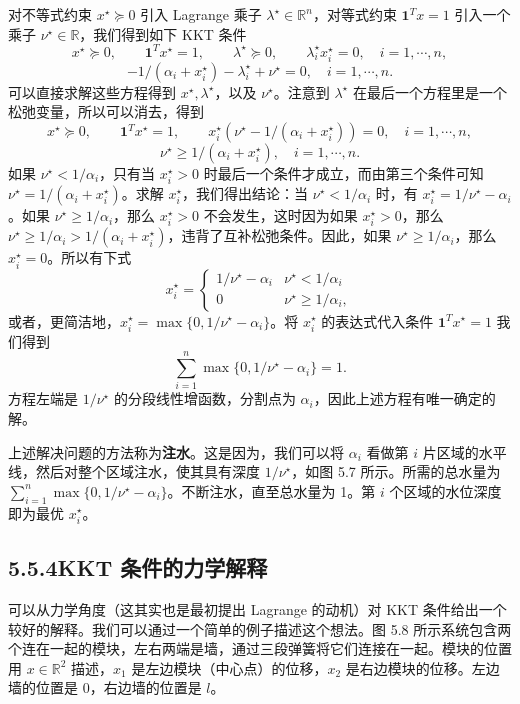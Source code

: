 \documentclass[UTF8,12pt,a4paper,fontset=fandol]{ctexart}
\begin{document}
对不等式约束 $x^\star\succeq 0$ 引入 Lagrange 乘子 $\lambda^\star\in\mathbb{R}^n$，对等式约束 $\mathbf{1}^Tx=1$ 引入一个乘子 $\nu^\star\in\mathbb{R}$，我们得到如下 KKT 条件
\[
x^\star\succeq 0,\qquad \mathbf{1}^Tx^\star=1,\qquad
\lambda^\star\succeq 0,\qquad \lambda_i^\star x_i^\star=0,\quad i=1,\cdots,n,
\]
\[
-1/(\alpha_i+x_i^\star)-\lambda_i^\star+\nu^\star=0,\quad i=1,\cdots,n.
\]
可以直接求解这些方程得到 $x^\star,\lambda^\star$，以及 $\nu^\star$。注意到 $\lambda^\star$ 在最后一个方程里是一个松弛变量，所以可以消去，得到
\[
x^\star\succeq 0,\qquad \mathbf{1}^Tx^\star=1,\qquad
x_i^\star(\nu^\star-1/(\alpha_i+x_i^\star))=0,\quad i=1,\cdots,n,
\]
\[
\nu^\star\geq 1/(\alpha_i+x_i^\star),\quad i=1,\cdots,n.
\]
如果 $\nu^\star<1/\alpha_i$，只有当 $x_i^\star>0$ 时最后一个条件才成立，而由第三个条件可知 $\nu^\star=1/(\alpha_i+x_i^\star)$。求解 $x_i^\star$，我们得出结论：当 $\nu^\star<1/\alpha_i$ 时，有 $x_i^\star=1/\nu^\star-\alpha_i$。如果 $\nu^\star\geq 1/\alpha_i$，那么 $x_i^\star>0$ 不会发生，这时因为如果 $x_i^\star>0$，那么 $\nu^\star\geq 1/\alpha_i>1/(\alpha_i+x_i^\star)$，违背了互补松弛条件。因此，如果 $\nu^\star\geq 1/\alpha_i$，那么 $x_i^\star=0$。所以有下式
\[
x_i^\star=
\begin{cases}
1/\nu^\star-\alpha_i & \nu^\star<1/\alpha_i\\
0 & \nu^\star\geq 1/\alpha_i,
\end{cases}
\]
或者，更简洁地，$x_i^\star=\max\{0,1/\nu^\star-\alpha_i\}$。将 $x_i^\star$ 的表达式代入条件 $\mathbf{1}^Tx^\star=1$ 我们得到
\[
\sum_{i=1}^n\max\{0,1/\nu^\star-\alpha_i\}=1.
\]
方程左端是 $1/\nu^\star$ 的分段线性增函数，分割点为 $\alpha_i$，因此上述方程有唯一确定的解。

上述解决问题的方法称为\textbf{注水}。这是因为，我们可以将 $\alpha_i$ 看做第 $i$ 片区域的水平线，然后对整个区域注水，使其具有深度 $1/\nu^\star$，如图 5.7 所示。所需的总水量为 $\sum_{i=1}^n\max\{0,1/\nu^\star-\alpha_i\}$。不断注水，直至总水量为 1。第 $i$ 个区域的水位深度即为最优 $x_i^\star$。

\subsection*{5.5.4\quad KKT 条件的力学解释}

可以从力学角度（这其实也是最初提出 Lagrange 的动机）对 KKT 条件给出一个较好的解释。我们可以通过一个简单的例子描述这个想法。图 5.8 所示系统包含两个连在一起的模块，左右两端是墙，通过三段弹簧将它们连接在一起。模块的位置用 $x\in\mathbb{R}^2$ 描述，$x_1$ 是左边模块（中心点）的位移，$x_2$ 是右边模块的位移。左边墙的位置是 0，右边墙的位置是 $l$。
\end{document}
